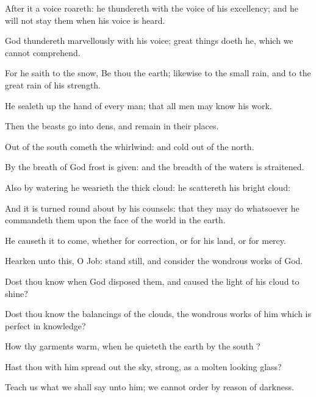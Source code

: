 {After it a
voice
roareth: he
thundereth with the
voice of his
excellency; and he will not
stay them when his
voice is
heard.

God
thundereth
marvellously with his
voice; great
things
doeth he, which we cannot
comprehend.


\par }{\PP {}For he
saith to the
snow, Be
thou
{} the
earth; likewise to the
small
rain, and to the
great
rain of his
strength.

He sealeth
up the
hand of every
man; that all
men may
know his
work.

Then the
beasts
go
into
dens, and
remain in their
places.

Out of the
south
cometh the
whirlwind: and
cold out of the
north.

By the
breath of
God
frost is
given: and the
breadth of the
waters is
straitened.

Also by
watering he
wearieth the thick
cloud: he
scattereth his
bright
cloud:

And it is
turned round
about by his
counsels: that they may
do whatsoever he
commandeth them upon the
face of the
world in the
earth.

He causeth it to
come, whether for
correction, or for his
land, or for
mercy.


\par }{\PP {}Hearken unto this, O
Job: stand
still, and
consider the
wondrous works of
God.

Dost thou
know when
God
disposed them, and caused the
light of his
cloud to
shine?

Dost thou
know the
balancings of the
clouds, the wondrous
works of him which is
perfect in
knowledge?

How thy
garments
{}
warm, when he
quieteth the
earth by the
south
{}?

Hast thou with him spread
out the
sky,
{}
strong,
{} as a
molten looking
glass?

Teach us what we shall
say unto him;
{} we cannot
order
{} by
reason of
darkness.

}
